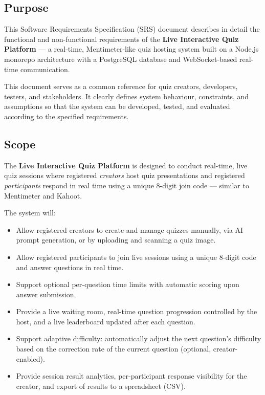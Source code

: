 \documentclass[12pt,a4paper]{article}
\begin{document}
\subsection{Purpose}
This Software Requirements Specification (SRS) document describes in detail the
functional and non-functional requirements of the \textbf{Live Interactive Quiz
Platform} --- a real-time, Mentimeter-like quiz hosting system built on a
Node.js monorepo architecture with a PostgreSQL database and WebSocket-based
real-time communication.

This document serves as a common reference for quiz creators, developers, testers,
and stakeholders. It clearly defines system behaviour, constraints, and assumptions
so that the system can be developed, tested, and evaluated according to the
specified requirements.

\subsection{Scope}
The \textbf{Live Interactive Quiz Platform} is designed to conduct real-time, live
quiz sessions where registered \emph{creators} host quiz presentations and
registered \emph{participants} respond in real time using a unique 8-digit join code
--- similar to Mentimeter and Kahoot.

\noindent The system will:
\begin{itemize}
  \item Allow registered creators to create and manage quizzes manually, via AI
        prompt generation, or by uploading and scanning a quiz image.
  \item Allow registered participants to join live sessions using a unique 8-digit
        code and answer questions in real time.
  \item Support optional per-question time limits with automatic scoring upon answer
        submission.
  \item Provide a live waiting room, real-time question progression controlled by
        the host, and a live leaderboard updated after each question.
  \item Support adaptive difficulty: automatically adjust the next question's
        difficulty based on the correction rate of the current question
        (optional, creator-enabled).
  \item Provide session result analytics, per-participant response visibility for
        the creator, and export of results to a spreadsheet (CSV).
\end{itemize}
\end{document}
